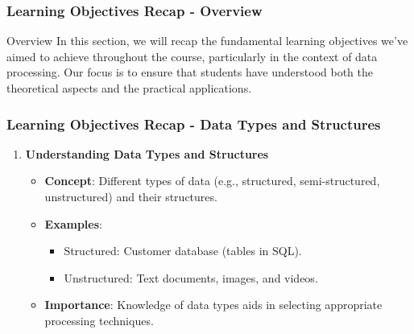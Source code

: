 \documentclass[aspectratio=169]{beamer}
\begin{document}
\begin{frame}[fragile]
    \frametitle{Learning Objectives Recap - Overview}
    \begin{block}{Overview}
        In this section, we will recap the fundamental learning objectives we've aimed to achieve throughout the course, particularly in the context of data processing. 
        Our focus is to ensure that students have understood both the theoretical aspects and the practical applications.
    \end{block}
\end{frame}

\begin{frame}[fragile]
    \frametitle{Learning Objectives Recap - Data Types and Structures}
    \begin{enumerate}
        \item \textbf{Understanding Data Types and Structures}
        \begin{itemize}
            \item \textbf{Concept}: Different types of data (e.g., structured, semi-structured, unstructured) and their structures.
            \item \textbf{Examples}: 
                \begin{itemize}
                    \item Structured: Customer database (tables in SQL).
                    \item Unstructured: Text documents, images, and videos.
                \end{itemize}
            \item \textbf{Importance}: Knowledge of data types aids in selecting appropriate processing techniques.
        \end{itemize}
    \end{enumerate}
\end{frame}
\end{document}
